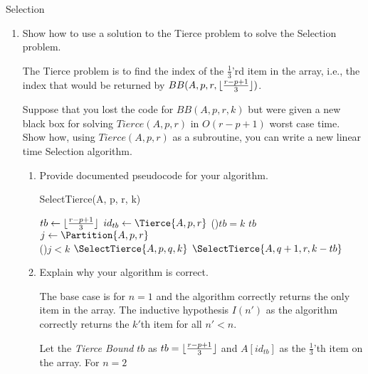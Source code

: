 \documentclass{article}
\begin{document}
\begin{section}{Selection}
\begin{enumerate}
    \item Show how to use a solution to the Tierce problem to solve the Selection problem.

    The Tierce problem is to find the index of the $\frac{1}{3}$’rd item in the array,  i.e., the index that would be returned by $BB(A, p, r, \lfloor\frac{r-p+1}{3}\rfloor)$. 
    
    Suppose that you lost the code for $BB(A, p, r, k)$ but were given a new black box for solving $Tierce(A, p, r)$ in $O(r - p + 1)$ worst case time. Show how, using $Tierce(A, p, r)$ as a subroutine, you can write a new linear time Selection algorithm.
    
    \begin{enumerate}
        \item Provide documented pseudocode for your algorithm.
        
        \begin{minipage}{\linewidth}
        \begin{algorithm}[H]
        \caption{SelectTierce(A, p, r, k)}
            $tb \gets \lfloor\frac{r-p + 1}{3}\rfloor$ 
            $id_{tb} \gets \Tierce{A, p, r}$ 
            \eIf(){$tb =k$}{
                \KwRet $tb$
                }{
                 \\
                $j \gets \Partition{A, p, r}$ \\
                \eIf(){$j < k$}{
                    \KwRet $\SelectTierce{A, p, q, k}$
                }{
                    \KwRet $\SelectTierce{A, q+1, r, k - tb}$
                }
            }
        \end{algorithm}
        \end{minipage}
        
        \item Explain why your algorithm is correct.
        
        The base case is for $n = 1$ and the algorithm correctly returns the only item in the array. The inductive hypothesis $I(n')$ as the algorithm correctly returns the $k'$th item for all $n' < n$. 
        
        Let the {\em Tierce Bound} $tb$ as $tb = \lfloor\frac{r-p + 1}{3}\rfloor$ and $A[id_{tb}]$ as the $\frac{1}{3}$'th item on the array. For $n = 2$
        

\end{enumerate}
\end{enumerate}
\end{section}
\end{document}
